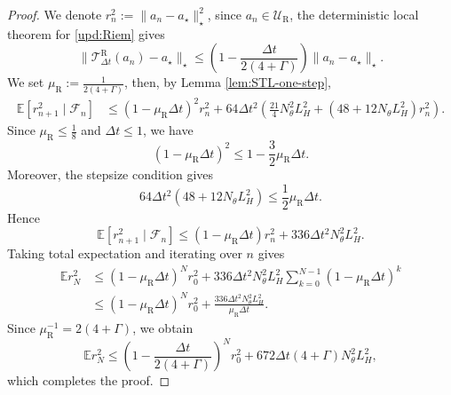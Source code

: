 \documentclass[11pt]{article}
\theoremstyle{plain}
\theoremstyle{definition}
\theoremstyle{remark}
\newcommand{\E}{\mathbb{E}}
\begin{document}
\begin{proof}
    We denote $r_n^2 := \|a_n-a_\star\|_\star^2$,
    since $a_n\in \mathcal{U}_{\mathrm R}$, the deterministic local theorem for \eqref{upd:Riem} gives
    \begin{equation*}
        \|\mathcal{T}_{\Delta t}^{\mathrm R}(a_n)-a_\star\|_\star
        \leq
        \left(
            1-\frac{\Delta t}{2(4+\Gamma)}
        \right)
        \|a_n-a_\star\|_\star.
    \end{equation*}
    We set $\mu_{\mathrm R}:=\frac{1}{2(4+\Gamma)}$,
    then, by Lemma \ref{lem:STL-one-step},
    \begin{align*}
        \E[r_{n+1}^2\mid \mathcal{F}_n]
        &\leq
        (1-\mu_{\mathrm R}\Delta t)^2 r_n^2 +
        64\Delta t^2
        \left(
            \frac{21}{4}N_\theta^2L_H^2
            +
            (48+12N_\theta L_H^2)r_n^2
        \right).
    \end{align*}
    Since $\mu_{\mathrm R}\leq \frac{1}{8}$ and $\Delta t\leq 1$, we have
    \begin{equation*}
        (1-\mu_{\mathrm R}\Delta t)^2
        \leq
        1-\frac{3}{2}\mu_{\mathrm R}\Delta t.
    \end{equation*}
    Moreover, the stepsize condition gives
    \begin{equation*}
        64\Delta t^2(48+12N_\theta L_H^2)
        \leq
        \frac{1}{2}\mu_{\mathrm R}\Delta t.
    \end{equation*}
    Hence
    \begin{equation*}
        \E[r_{n+1}^2\mid \mathcal{F}_n]
        \leq
        (1-\mu_{\mathrm R}\Delta t)r_n^2
        +
        336\Delta t^2N_\theta^2L_H^2.
    \end{equation*}
    Taking total expectation and iterating over $n$ gives
    \begin{align*}
        \E r_N^2
        &\leq
        (1-\mu_{\mathrm R}\Delta t)^N r_0^2
        +
        336\Delta t^2N_\theta^2L_H^2
        \sum_{k=0}^{N-1}
        (1-\mu_{\mathrm R}\Delta t)^k \\
        &\leq
        (1-\mu_{\mathrm R}\Delta t)^N r_0^2
        +
        \frac{336\Delta t^2N_\theta^2L_H^2}{\mu_{\mathrm R}\Delta t}.
    \end{align*}
    Since $\mu_{\mathrm R}^{-1}=2(4+\Gamma)$, we obtain
    \begin{equation*}
        \E r_N^2
        \leq
        \left(
            1-\frac{\Delta t}{2(4+\Gamma)}
        \right)^N
        r_0^2
        +
        672\Delta t(4+\Gamma)N_\theta^2L_H^2,
    \end{equation*}
    which completes the proof.
\end{proof}
\end{document}
